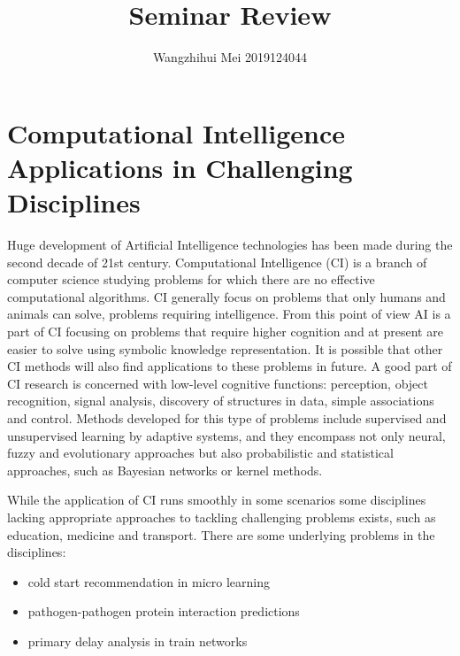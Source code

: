 \documentclass[11pt,en]{elegantpaper}
\title{Seminar Review}
\author{Wangzhihui Mei 2019124044}
\institute{CCNU-UOW JI}
\date{}
\begin{document}
\maketitle
\section{Computational Intelligence Applications in Challenging Disciplines}


Huge development of Artificial Intelligence technologies has been made during the second decade of 21st  century. Computational Intelligence (CI) is a branch of computer science studying problems for which there are no effective computational algorithms. CI generally focus on problems that only humans and animals can solve, problems requiring intelligence. From this point of view AI is a part of CI focusing on problems that require higher cognition and at present are easier to solve using symbolic knowledge representation. It is possible that other CI methods will also find applications to these problems in future. A good part of CI research is concerned with low-level cognitive functions: perception, object recognition, signal analysis, discovery of structures in data, simple associations and control. Methods developed for this type of problems include supervised and unsupervised learning by adaptive systems, and they encompass not only neural, fuzzy and evolutionary approaches but also probabilistic and statistical approaches, such as Bayesian networks or kernel methods. 

While the application of CI runs smoothly in some scenarios some disciplines lacking appropriate approaches to tackling challenging problems exists, such as education, medicine and transport. There are some underlying problems in the disciplines:
\begin{itemize}
	\item cold start recommendation in micro learning
	\item pathogen-pathogen protein interaction predictions
	\item primary delay analysis in train networks
\end{itemize}
\end{document}
